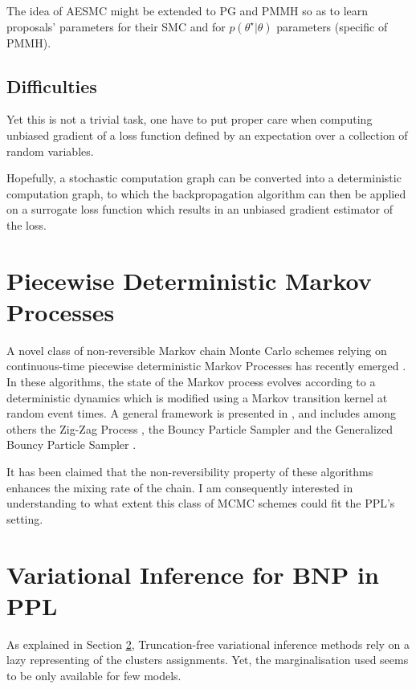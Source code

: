 The idea of AESMC \cite{Le:2017wm} might be extended to \gls{PG} and \gls{PMMH} so as to learn proposals' parameters for their \gls{SMC} and for $p(\theta^\star|\theta)$ parameters (specific of \gls{PMMH}).

\subsection{Difficulties}
Yet this is not a trivial task, one have to put proper care when computing unbiased gradient of a loss function defined by an expectation over a collection of random variables.

Hopefully, a stochastic computation graph \cite{Schulman:2015wk} can be converted into a deterministic computation graph, to which the backpropagation algorithm can then be applied on a surrogate loss function which results in an unbiased gradient estimator of the loss.


\section{Piecewise Deterministic Markov Processes}
A novel class of non-reversible Markov chain Monte Carlo schemes relying on continuous-time piecewise deterministic Markov Processes has recently emerged \cite{Vanetti:2017ux}. In these algorithms, the state of the Markov process evolves according to a deterministic dynamics which is modified using a Markov transition kernel at random event times. A general framework is presented in \cite{Bierkens:2017we}, and includes among others the Zig-Zag Process \cite{Bierkens:2016uk}, the Bouncy Particle Sampler \cite{BouchardCote:2017gs} and the Generalized Bouncy Particle Sampler \cite{Wu:2017uz}.


It has been claimed \cite{Bierkens:2017we} that the non-reversibility property of these algorithms enhances the mixing rate of the chain.
I am consequently interested in understanding to what extent this class of MCMC schemes could fit the \gls{PPL}'s setting.


\section{Variational Inference for \gls{BNP} in \gls{PPL}} \label{BNP_VI}
As explained in Section \ref{BNP_VI}, Truncation-free variational inference methods rely on a lazy representing of the clusters assignments. Yet, the marginalisation used seems to be only available for few models.

